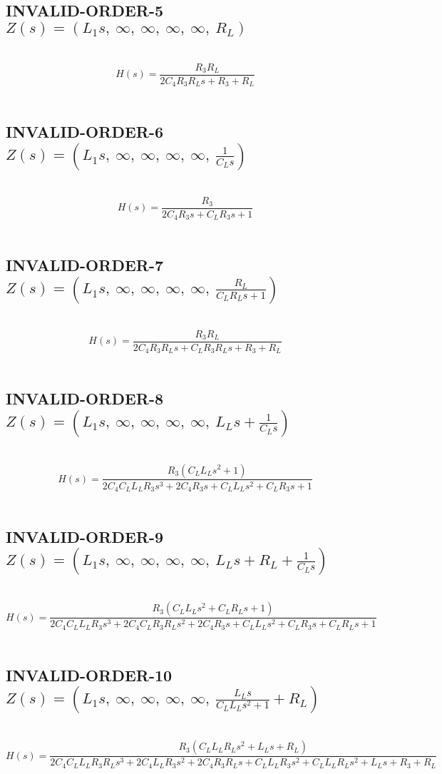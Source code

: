\documentclass{article}
\begin{document}
\subsection{INVALID-ORDER-5 $Z(s) = \left( L_{1} s, \  \infty, \  \infty, \  \infty, \  \infty, \  R_{L}\right)$ } \ 
\textbf{\[H(s) = \frac{R_{3} R_{L}}{2 C_{4} R_{3} R_{L} s + R_{3} + R_{L}}\] } \ 
\subsection{INVALID-ORDER-6 $Z(s) = \left( L_{1} s, \  \infty, \  \infty, \  \infty, \  \infty, \  \frac{1}{C_{L} s}\right)$ } \ 
\textbf{\[H(s) = \frac{R_{3}}{2 C_{4} R_{3} s + C_{L} R_{3} s + 1}\] } \ 
\subsection{INVALID-ORDER-7 $Z(s) = \left( L_{1} s, \  \infty, \  \infty, \  \infty, \  \infty, \  \frac{R_{L}}{C_{L} R_{L} s + 1}\right)$ } \ 
\textbf{\[H(s) = \frac{R_{3} R_{L}}{2 C_{4} R_{3} R_{L} s + C_{L} R_{3} R_{L} s + R_{3} + R_{L}}\] } \ 
\subsection{INVALID-ORDER-8 $Z(s) = \left( L_{1} s, \  \infty, \  \infty, \  \infty, \  \infty, \  L_{L} s + \frac{1}{C_{L} s}\right)$ } \ 
\textbf{\[H(s) = \frac{R_{3} \left(C_{L} L_{L} s^{2} + 1\right)}{2 C_{4} C_{L} L_{L} R_{3} s^{3} + 2 C_{4} R_{3} s + C_{L} L_{L} s^{2} + C_{L} R_{3} s + 1}\] } \ 
\subsection{INVALID-ORDER-9 $Z(s) = \left( L_{1} s, \  \infty, \  \infty, \  \infty, \  \infty, \  L_{L} s + R_{L} + \frac{1}{C_{L} s}\right)$ } \ 
\textbf{\[H(s) = \frac{R_{3} \left(C_{L} L_{L} s^{2} + C_{L} R_{L} s + 1\right)}{2 C_{4} C_{L} L_{L} R_{3} s^{3} + 2 C_{4} C_{L} R_{3} R_{L} s^{2} + 2 C_{4} R_{3} s + C_{L} L_{L} s^{2} + C_{L} R_{3} s + C_{L} R_{L} s + 1}\] } \ 
\subsection{INVALID-ORDER-10 $Z(s) = \left( L_{1} s, \  \infty, \  \infty, \  \infty, \  \infty, \  \frac{L_{L} s}{C_{L} L_{L} s^{2} + 1} + R_{L}\right)$ } \ 
\textbf{\[H(s) = \frac{R_{3} \left(C_{L} L_{L} R_{L} s^{2} + L_{L} s + R_{L}\right)}{2 C_{4} C_{L} L_{L} R_{3} R_{L} s^{3} + 2 C_{4} L_{L} R_{3} s^{2} + 2 C_{4} R_{3} R_{L} s + C_{L} L_{L} R_{3} s^{2} + C_{L} L_{L} R_{L} s^{2} + L_{L} s + R_{3} + R_{L}}\] } \ 
\end{document}

